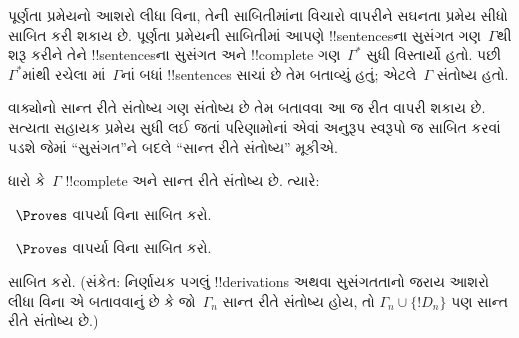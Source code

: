 \documentclass[../../../include/open-logic-section]{subfiles}
\begin{document}
      {}
      {}


પૂર્ણતા પ્રમેયનો આશરો લીધા વિના, તેની સાબિતીમાંના વિચારો વાપરીને
સઘનતા પ્રમેય સીધો સાબિત કરી શકાય છે. પૂર્ણતા પ્રમેયની સાબિતીમાં આપણે
!!{sentence}sના સુસંગત ગણ~$\Gamma$થી શરૂ કરીને તેને !!{sentence}sના
સુસંગત અને !!{complete} ગણ~$\Gamma^*$ સુધી
વિસ્તાર્યો હતો. પછી~$\Gamma^*$માંથી રચેલા
માં~$\Gamma$નાં બધાં !!{sentence}s સાચાં છે
તેમ બતાવ્યું હતું; એટલે~$\Gamma$ સંતોષ્ય હતો.

વાક્યોનો સાન્ત રીતે સંતોષ્ય ગણ સંતોષ્ય છે તેમ બતાવવા આ જ રીત વાપરી
શકાય છે. સત્યતા સહાયક પ્રમેય સુધી લઈ જતાં પરિણામોનાં એવાં અનુરૂપ
સ્વરૂપો જ સાબિત કરવાં પડશે જેમાં ``સુસંગત''ને બદલે ``સાન્ત રીતે
સંતોષ્ય'' મૂકીએ.

\begin{prop}
ધારો કે~$\Gamma$ !!{complete} અને સાન્ત રીતે સંતોષ્ય છે. ત્યારે:
\begin{enumerate}


\end{enumerate}
\end{prop}

\begin{prob}
~$\Proves$ વાપર્યા વિના 
સાબિત કરો.
\end{prob}
\tagendprob

\begin{prob}
~$\Proves$ વાપર્યા વિના 
સાબિત કરો.
\end{prob}
\tagendprob


\begin{prob}
 સાબિત કરો. (સંકેત: નિર્ણાયક
પગલું !!{derivation}s અથવા સુસંગતતાનો જરાય આશરો લીધા વિના એ બતાવવાનું
છે કે જો~$\Gamma_n$ સાન્ત રીતે સંતોષ્ય હોય, તો
$\Gamma_n\cup\{!D_n\}$ પણ સાન્ત રીતે સંતોષ્ય છે.)
\end{prob}
\tagendprob
\end{document}
